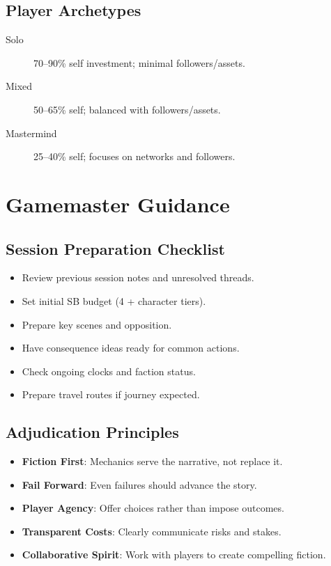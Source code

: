 \subsection{Player Archetypes}
\label{subsec:archetypes-ref}

\begin{description}
\item[Solo] 70--90\% self investment; minimal followers/assets.
\item[Mixed] 50--65\% self; balanced with followers/assets.
\item[Mastermind] 25--40\% self; focuses on networks and followers.
\end{description}

\section{Gamemaster Guidance}
\label{sec:gm-reference}

\subsection{Session Preparation Checklist}
\label{subsec:session-prep-ref}

\begin{itemize}
\item Review previous session notes and unresolved threads.
\item Set initial SB budget (4 + character tiers).
\item Prepare key scenes and opposition.
\item Have consequence ideas ready for common actions.
\item Check ongoing clocks and faction status.
\item Prepare travel routes if journey expected.
\end{itemize}

\subsection{Adjudication Principles}
\label{subsec:adjudication-ref}

\begin{itemize}
\item \textbf{Fiction First}: Mechanics serve the narrative, not replace it.
\item \textbf{Fail Forward}: Even failures should advance the story.
\item \textbf{Player Agency}: Offer choices rather than impose outcomes.
\item \textbf{Transparent Costs}: Clearly communicate risks and stakes.
\item \textbf{Collaborative Spirit}: Work with players to create compelling fiction.
\end{itemize}

